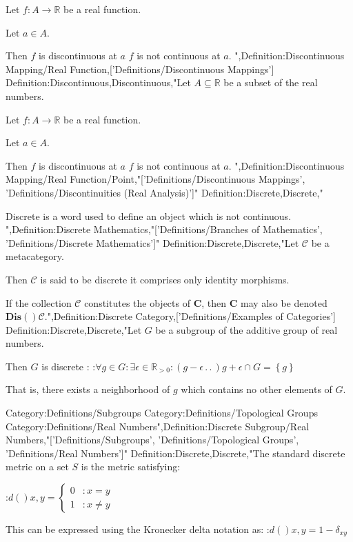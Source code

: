 Let $f : A \to \mathbb R$ be a real function.

Let $a\in A$.


Then $f$ is discontinuous at $a$  $f$ is not continuous at $a$.
",Definition:Discontinuous Mapping/Real Function,['Definitions/Discontinuous Mappings']
Definition:Discontinuous,Discontinuous,"Let $A \subseteq \mathbb R$ be a subset of the real numbers.

Let $f : A \to \mathbb R$ be a real function.

Let $a\in A$.


Then $f$ is discontinuous at $a$  $f$ is not continuous at $a$.
",Definition:Discontinuous Mapping/Real Function/Point,"['Definitions/Discontinuous Mappings', 'Definitions/Discontinuities (Real Analysis)']"
Definition:Discrete,Discrete,"

Discrete is a word used to define an object which is not continuous.
",Definition:Discrete Mathematics,"['Definitions/Branches of Mathematics', 'Definitions/Discrete Mathematics']"
Definition:Discrete,Discrete,"Let $\mathcal C$ be a metacategory.


Then $\mathcal C$ is said to be discrete  it comprises only identity morphisms.

If the collection $\mathcal C$ constitutes the objects of $\mathbf C$, then $\mathbf C$ may also be denoted $\mathbf {Dis}  \left(   \right)\mathcal C$.",Definition:Discrete Category,['Definitions/Examples of Categories']
Definition:Discrete,Discrete,"Let $G$ be a subgroup of the additive group of real numbers.


Then $G$ is discrete :
:$\forall g \in G: \exists \epsilon \in \mathbb R_{>0}: \left( g - \epsilon \,.\,.\,   \right){g + \epsilon} \cap G = \left\lbrace g \right\rbrace$

That is, there exists a neighborhood of $g$ which contains no other elements of $G$.


Category:Definitions/Subgroups
Category:Definitions/Topological Groups
Category:Definitions/Real Numbers",Definition:Discrete Subgroup/Real Numbers,"['Definitions/Subgroups', 'Definitions/Topological Groups', 'Definitions/Real Numbers']"
Definition:Discrete,Discrete,"The standard discrete metric on a set $S$ is the metric satisfying:

:$d \left(   \right){x, y} = \begin {cases} 0 & : x = y \\ 1 & : x \ne y \end {cases}$


This can be expressed using the Kronecker delta notation as:
:$d \left(   \right){x, y} = 1 - \delta_{x y}$


